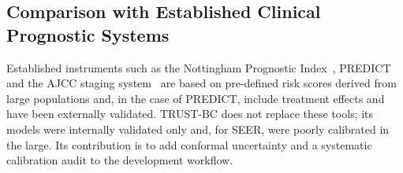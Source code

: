 \documentclass[11pt,a4paper]{article}
\begin{document}
\subsection{Comparison with Established Clinical Prognostic Systems}\label{sec:comparison-with-established-cl}
Established instruments such as the Nottingham Prognostic Index~\cite{galea1992}, PREDICT~\cite{candido2017} and the AJCC staging system~\cite{giuliano2017} are based on pre-defined risk scores derived from large populations and, in the case of PREDICT, include treatment effects and have been externally validated. TRUST-BC does not replace these tools; its models were internally validated only and, for SEER, were poorly calibrated in the large. Its contribution is to add conformal uncertainty and a systematic calibration audit to the development workflow.
\end{document}
